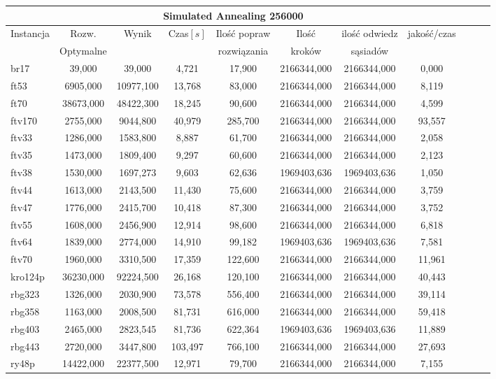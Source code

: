 \begin{center}

\begin{tabular}{lcccccccccc}

\toprule
\multicolumn{8}{c}{Simulated Annealing 256000} \\
\midrule
\multirow{2}{*}{Instancja} & {Rozw.} &
 Wynik & Czas$[s]$ & Ilość popraw & Ilość &
 ilość odwiedz & jakość/czas
 \\
 & Optymalne &  &  
 & rozwiązania & kroków & sąsiadów & 
  \\
\toprule
br17 & 39,000 & 39,000 & 4,721 & 17,900 & 2166344,000 & 2166344,000 & 0,000 \\
\midrule
ft53 & 6905,000 & 10977,100 & 13,768 & 83,000 & 2166344,000 & 2166344,000 & 8,119 \\
\midrule
ft70 & 38673,000 & 48422,300 & 18,245 & 90,600 & 2166344,000 & 2166344,000 & 4,599 \\
\midrule
ftv170 & 2755,000 & 9044,800 & 40,979 & 285,700 & 2166344,000 & 2166344,000 & 93,557 \\
\midrule
ftv33 & 1286,000 & 1583,800 & 8,887 & 61,700 & 2166344,000 & 2166344,000 & 2,058 \\
\midrule
ftv35 & 1473,000 & 1809,400 & 9,297 & 60,600 & 2166344,000 & 2166344,000 & 2,123 \\
\midrule
ftv38 & 1530,000 & 1697,273 & 9,603 & 62,636 & 1969403,636 & 1969403,636 & 1,050 \\
\midrule
ftv44 & 1613,000 & 2143,500 & 11,430 & 75,600 & 2166344,000 & 2166344,000 & 3,759 \\
\midrule
ftv47 & 1776,000 & 2415,700 & 10,418 & 87,300 & 2166344,000 & 2166344,000 & 3,752 \\
\midrule
ftv55 & 1608,000 & 2456,900 & 12,914 & 98,600 & 2166344,000 & 2166344,000 & 6,818 \\
\midrule
ftv64 & 1839,000 & 2774,000 & 14,910 & 99,182 & 1969403,636 & 1969403,636 & 7,581 \\
\midrule
ftv70 & 1960,000 & 3310,500 & 17,359 & 122,600 & 2166344,000 & 2166344,000 & 11,961 \\
\midrule
kro124p & 36230,000 & 92224,500 & 26,168 & 120,100 & 2166344,000 & 2166344,000 & 40,443 \\
\midrule
rbg323 & 1326,000 & 2030,900 & 73,578 & 556,400 & 2166344,000 & 2166344,000 & 39,114 \\
\midrule
rbg358 & 1163,000 & 2008,500 & 81,731 & 616,000 & 2166344,000 & 2166344,000 & 59,418 \\
\midrule
rbg403 & 2465,000 & 2823,545 & 81,736 & 622,364 & 1969403,636 & 1969403,636 & 11,889 \\
\midrule
rbg443 & 2720,000 & 3447,800 & 103,497 & 766,100 & 2166344,000 & 2166344,000 & 27,693 \\
\midrule
ry48p & 14422,000 & 22377,500 & 12,971 & 79,700 & 2166344,000 & 2166344,000 & 7,155 \\
\bottomrule
\end{tabular}
\end{center}

